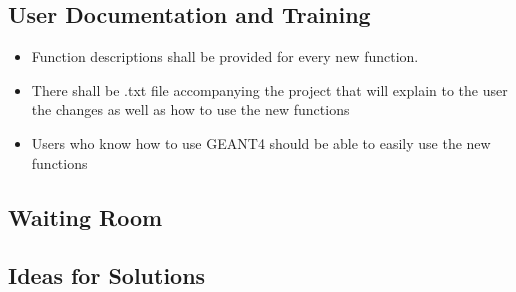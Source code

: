 \documentclass[12pt]{article}
\begin{document}
\subsection{User Documentation and Training} %
\begin{itemize}
	\item Function descriptions shall be provided for every new function. 
	\item There shall be .txt file accompanying the project that will explain to the user the changes as well as how to use the new functions
	\item Users who know how to use GEANT4 should be able to easily use the new functions
\end{itemize}
\subsection{Waiting Room} %
\subsection{Ideas for Solutions} %
\end{document}
